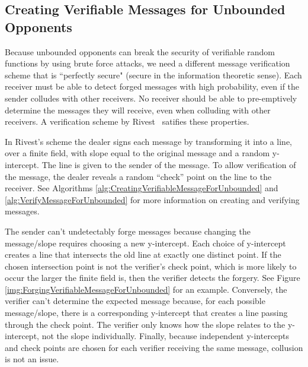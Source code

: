 \documentclass{dalcsthesis}
\begin{document}
\subsection{Creating Verifiable Messages for Unbounded Opponents}
\label{sec:vermes}

Because unbounded opponents can break the security of verifiable random functions by using brute force attacks, we need a different message verification scheme that is ``perfectly secure" (secure in the information theoretic sense). Each receiver must be able to detect forged messages with high probability, even if the sender colludes with other receivers. No receiver should be able to pre-emptively determine the messages they will receive, even when colluding with other receivers. A verification scheme by Rivest~\cite{rivest99} satifies these properties.

In Rivest's scheme the dealer signs each message by transforming it into a line, over a finite field, with slope equal to the original message and a random y-intercept. The line is given to the sender of the message. To allow verification of the message, the dealer reveals a random ``check'' point on the line to the receiver. See Algorithms \ref{alg:CreatingVerifiableMessageForUnbounded} and \ref{alg:VerifyMessageForUnbounded} for more information on creating and verifying messages.

The sender can't undetectably forge messages because changing the message/slope requires choosing a new y-intercept. Each choice of y-intercept creates a line that intersects the old line at exactly one distinct point. If the chosen intersection point is not the verifier's check point, which is more likely to occur the larger the finite field is, then the verifier detects the forgery. See Figure \ref{img:ForgingVerifiableMessageForUnbounded} for an example. Conversely, the verifier can't determine the expected message because, for each possible message/slope, there is a corresponding y-intercept that creates a line passing through the check point. The verifier only knows how the slope relates to the y-intercept, not the slope individually. Finally, because independent y-intercepts and check points are chosen for each verifier receiving the same message, collusion is not an issue.
\end{document}
